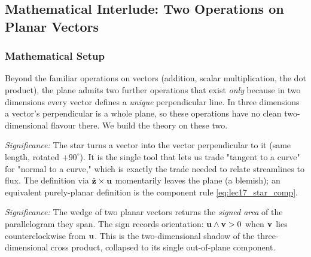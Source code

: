 \documentclass[../main.tex]{subfiles}
\begin{document}
\subsection{Mathematical Interlude: Two Operations on Planar Vectors}\label{sec:lec17:ops}

\subsubsection*{Mathematical Setup}
Beyond the familiar operations on vectors (addition, scalar multiplication, the dot product), the plane admits two further operations that exist \emph{only} because in two dimensions every vector defines a \emph{unique} perpendicular line. In three dimensions a vector's perpendicular is a whole plane, so these operations have no clean two-dimensional flavour there. We build the theory on these two.

\textit{Significance:} The star turns a vector into the vector perpendicular to it (same length, rotated $+90^\circ$). It is the single tool that lets us trade "tangent to a curve" for "normal to a curve," which is exactly the trade needed to relate streamlines to flux. The definition via $\hat{\mathbf{z}}\times\mathbf{u}$ momentarily leaves the plane (a blemish); an equivalent purely-planar definition is the component rule \eqref{eq:lec17_star_comp}.

\textit{Significance:} The wedge of two planar vectors returns the \emph{signed area} of the parallelogram they span. The sign records orientation: $\mathbf{u}\wedge\mathbf{v}>0$ when $\mathbf{v}$ lies counterclockwise from $\mathbf{u}$. This is the two-dimensional shadow of the three-dimensional cross product, collapsed to its single out-of-plane component.
\end{document}
